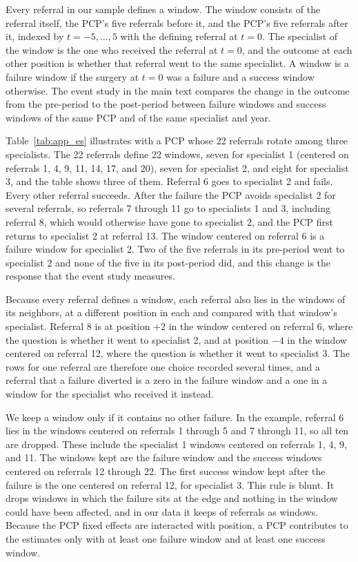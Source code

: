 \documentclass[12pt]{article}
\begin{document}
Every referral in our sample defines a window. The window consists of the referral itself, the PCP's five referrals before it, and the PCP's five referrals after it, indexed by $t=-5,\ldots,5$ with the defining referral at $t=0$. The specialist of the window is the one who received the referral at $t=0$, and the outcome at each other position is whether that referral went to the same specialist. A window is a failure window if the surgery at $t=0$ was a failure and a success window otherwise. The event study in the main text compares the change in the outcome from the pre-period to the post-period between failure windows and success windows of the same PCP and of the same specialist and year.

Table~\ref{tab:app_es} illustrates with a PCP whose 22 referrals rotate among three specialists. The 22 referrals define 22 windows, seven for specialist 1 (centered on referrals 1, 4, 9, 11, 14, 17, and 20), seven for specialist 2, and eight for specialist 3, and the table shows three of them. Referral 6 goes to specialist 2 and fails. Every other referral succeeds. After the failure the PCP avoids specialist 2 for several referrals, so referrals 7 through 11 go to specialists 1 and 3, including referral 8, which would otherwise have gone to specialist 2, and the PCP first returns to specialist 2 at referral 13. The window centered on referral 6 is a failure window for specialist 2. Two of the five referrals in its pre-period went to specialist 2 and none of the five in its post-period did, and this change is the response that the event study measures.

Because every referral defines a window, each referral also lies in the windows of its neighbors, at a different position in each and compared with that window's specialist. Referral 8 is at position $+2$ in the window centered on referral 6, where the question is whether it went to specialist 2, and at position $-4$ in the window centered on referral 12, where the question is whether it went to specialist 3. The rows for one referral are therefore one choice recorded several times, and a referral that a failure diverted is a zero in the failure window and a one in a window for the specialist who received it instead.

We keep a window only if it contains no other failure. In the example, referral 6 lies in the windows centered on referrals 1 through 5 and 7 through 11, so all ten are dropped. These include the specialist 1 windows centered on referrals 1, 4, 9, and 11. The windows kept are the failure window and the success windows centered on referrals 12 through 22. The first success window kept after the failure is the one centered on referral 12, for specialist 3. This rule is blunt. It drops windows in which the failure sits at the edge and nothing in the window could have been affected, and in our data it keeps \rereferESEvents{} of \rereferEvents{} referrals as windows. Because the PCP fixed effects are interacted with position, a PCP contributes to the estimates only with at least one failure window and at least one success window.
\end{document}
